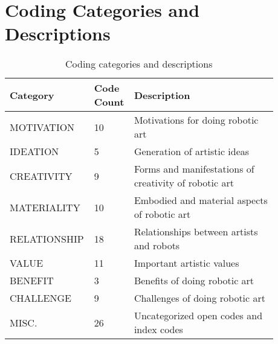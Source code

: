 \appendix

\section{Coding Categories and Descriptions}
\label{app: coding}
\begin{table}[hbp]
\centering
\begin{tabular}{p{0.24\linewidth} p{0.1\linewidth} p{0.539\linewidth}}
\toprule
Category & Code Count & Description\\
\midrule
MOTIVATION & 10 & Motivations for doing robotic art \\
IDEATION & 5 & Generation of artistic ideas\\
CREATIVITY & 9 & Forms and manifestations of creativity of robotic art \\
MATERIALITY& 10 & Embodied and material aspects of robotic art \\
RELATIONSHIP & 18 & Relationships between artists and robots \\
VALUE & 11 & Important artistic values \\
BENEFIT & 3 & Benefits of doing robotic art \\
CHALLENGE & 9 & Challenges of doing robotic art \\
MISC. & 26 & Uncategorized open codes and index codes\\
\bottomrule
\end{tabular}
\caption{Coding categories and descriptions}
\label{tab:categories}
\end{table}

